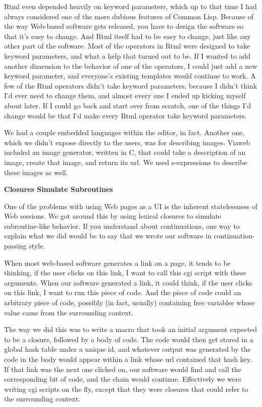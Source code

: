 Rtml even depended heavily on keyword parameters, which up to that time
I had always considered one of the more dubious features of Common Lisp.
Because of the way Web-based software gets released, you have to design
the software so that it's easy to change. And Rtml itself had to be easy
to change, just like any other part of the software. Most of the
operators in Rtml were designed to take keyword parameters, and what a
help that turned out to be. If I wanted to add another dimension to the
behavior of one of the operators, I could just add a new keyword
parameter, and everyone's existing templates would continue to work. A
few of the Rtml operators didn't take keyword parameters, because I
didn't think I'd ever need to change them, and almost every one I ended
up kicking myself about later. If I could go back and start over from
scratch, one of the things I'd change would be that I'd make every Rtml
operator take keyword parameters.

We had a couple embedded languages within the editor, in fact. Another
one, which we didn't expose directly to the users, was for describing
images. Viaweb included an image generator, written in C, that could
take a description of an image, create that image, and return its url.
We used s-expressions to describe these images as well.

\textbf{Closures Simulate Subroutines}

One of the problems with using Web pages as a UI is the inherent
statelessness of Web sessions. We got around this by using lexical
closures to simulate subroutine-like behavior. If you understand about
continuations, one way to explain what we did would be to say that we
wrote our software in continuation-passing style.

When most web-based software generates a link on a page, it tends to be
thinking, if the user clicks on this link, I want to call this cgi
script with these arguments. When our software generated a link, it
could think, if the user clicks on this link, I want to run this piece
of code. And the piece of code could an arbitrary piece of code,
possibly (in fact, usually) containing free variables whose value came
from the surrounding context.

The way we did this was to write a macro that took an initial argument
expected to be a closure, followed by a body of code. The code would
then get stored in a global hash table under a unique id, and whatever
output was generated by the code in the body would appear within a link
whose url contained that hash key. If that link was the next one clicked
on, our software would find and call the corresponding bit of code, and
the chain would continue. Effectively we were writing cgi scripts on the
fly, except that they were closures that could refer to the surrounding
context.

